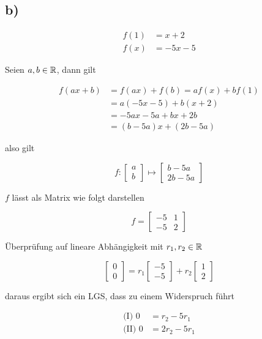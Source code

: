 \documentclass[a4paper, 11pt]{article}
\begin{document}
\subsection{b)}
\label{sec:orgd01c7ba}
\begin{align*}
    f(1) &= x + 2 \\
    f(x) &= -5x -5
\end{align*}

\pagebreak

Seien \(a, b \in \mathbb{R}\), dann gilt

\begin{align*}
    f(ax + b) &= f(ax) + f(b) = a f(x) + b f(1) \\
    &= a(-5x - 5) + b(x + 2) \\
    &= -5ax - 5a + bx + 2b \\
    &= (b - 5a)x + (2b - 5a)
\end{align*}

also gilt

$$ f: \begin{bmatrix} a \\ b \end{bmatrix} \mapsto
    \begin{bmatrix} b - 5a \\ 2b - 5a \end{bmatrix} $$

\(f\) lässt als Matrix wie folgt darstellen

$$ f = \begin{bmatrix} -5 & 1 \\ -5 & 2 \end{bmatrix} $$

Überprüfung auf lineare Abhängigkeit mit \(r_1, r_2 \in \mathbb{R}\)

$$ \begin{bmatrix} 0 \\ 0 \end{bmatrix} =
    r_1 \begin{bmatrix} -5 \\ -5 \end{bmatrix} +
    r_2 \begin{bmatrix} 1 \\ 2 \end{bmatrix} $$

daraus ergibt sich ein LGS, dass zu einem Widerspruch führt

\begin{align*}
    \text{(I) } 0 &= r_2 - 5r_1 \\
    \text{(II) } 0 &= 2r_2 - 5r_1 \\
\end{align*}
\end{document}
